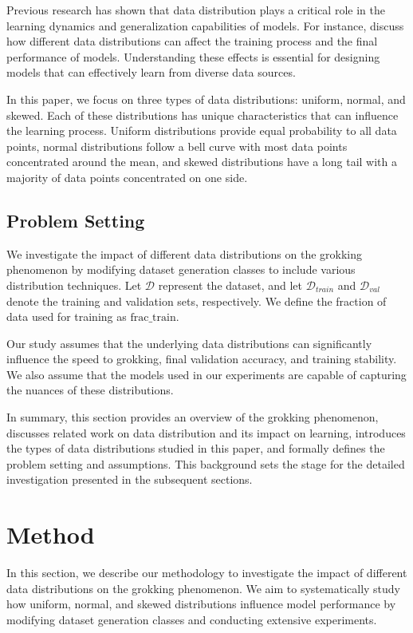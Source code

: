 \documentclass{article} %
\begin{document}
Previous research has shown that data distribution plays a critical role in the learning dynamics and generalization capabilities of models. For instance, \citet{goodfellow2016deep} discuss how different data distributions can affect the training process and the final performance of models. Understanding these effects is essential for designing models that can effectively learn from diverse data sources.

In this paper, we focus on three types of data distributions: uniform, normal, and skewed. Each of these distributions has unique characteristics that can influence the learning process. Uniform distributions provide equal probability to all data points, normal distributions follow a bell curve with most data points concentrated around the mean, and skewed distributions have a long tail with a majority of data points concentrated on one side.

\subsection{Problem Setting}
We investigate the impact of different data distributions on the grokking phenomenon by modifying dataset generation classes to include various distribution techniques. Let \( \mathcal{D} \) represent the dataset, and let \( \mathcal{D}_{train} \) and \( \mathcal{D}_{val} \) denote the training and validation sets, respectively. We define the fraction of data used for training as \( \text{frac\_train} \).

Our study assumes that the underlying data distributions can significantly influence the speed to grokking, final validation accuracy, and training stability. We also assume that the models used in our experiments are capable of capturing the nuances of these distributions.

In summary, this section provides an overview of the grokking phenomenon, discusses related work on data distribution and its impact on learning, introduces the types of data distributions studied in this paper, and formally defines the problem setting and assumptions. This background sets the stage for the detailed investigation presented in the subsequent sections.

\section{Method}
\label{sec:method}

In this section, we describe our methodology to investigate the impact of different data distributions on the grokking phenomenon. We aim to systematically study how uniform, normal, and skewed distributions influence model performance by modifying dataset generation classes and conducting extensive experiments.
\end{document}
